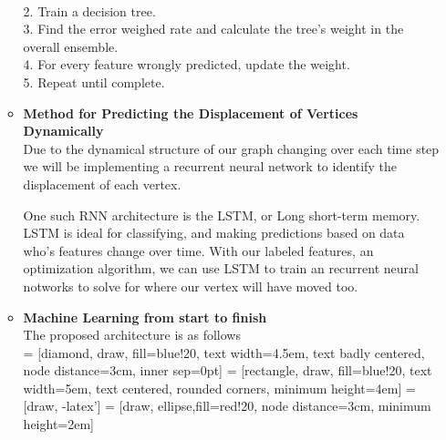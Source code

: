 \begin{itemize}
\begin{itemize}
\\
2. Train a decision tree.
\\
3. Find the error weighed rate and calculate the tree's weight in the overall ensemble. 
\\
4. For every feature wrongly predicted, update the weight. 
\\
5. Repeat until complete. 
\item \textbf{Method for Predicting the Displacement of Vertices Dynamically}
\bigskip
\\
Due to the dynamical structure of our graph changing over each time step we will be implementing a recurrent neural network to identify the displacement of each vertex. 

One such RNN architecture is the LSTM, or Long short-term memory. LSTM is ideal for classifying, and making predictions based on data who's features change over time. With our labeled features, an optimization algorithm, we can use LSTM to train an recurrent neural notworks to solve for where our vertex will have moved too. 
\bigskip
\bigskip
\\

\item \textbf{Machine Learning from start to finish}
\bigskip
\\
The proposed architecture is as follows
\bigskip
\\
 = [diamond, draw, fill=blue!20, 
    text width=4.5em, text badly centered, node distance=3cm, inner sep=0pt]
 = [rectangle, draw, fill=blue!20, 
    text width=5em, text centered, rounded corners, minimum height=4em]
 = [draw, -latex']
 = [draw, ellipse,fill=red!20, node distance=3cm,
    minimum height=2em]
    
\end{itemize}
\end{itemize}
